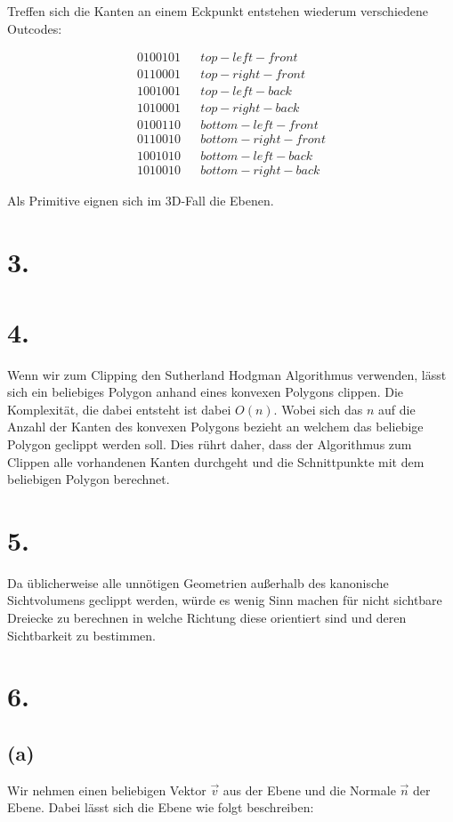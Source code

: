 \documentclass[12pt]{scrreprt}
\begin{document}
Treffen sich die Kanten an einem Eckpunkt entstehen wiederum verschiedene Outcodes:

\begin{align*}
	0100101& &top-left-front\\
	0110001& &top-right-front\\
	1001001& &top-left-back\\
	1010001& &top-right-back\\
	0100110& &bottom-left-front\\
	0110010& &bottom-right-front\\
	1001010& &bottom-left-back\\
	1010010& &bottom-right-back
\end{align*}

Als Primitive eignen sich im 3D-Fall die Ebenen.

\section*{3.}
\section*{4.}
Wenn wir zum Clipping den Sutherland Hodgman Algorithmus verwenden, lässt sich ein beliebiges Polygon anhand eines konvexen Polygons clippen. Die Komplexität, die dabei entsteht ist dabei $O(n)$. Wobei sich das $n$ auf die Anzahl der Kanten des konvexen Polygons bezieht an welchem das beliebige Polygon geclippt werden soll. Dies rührt daher, dass der Algorithmus zum Clippen alle vorhandenen Kanten durchgeht und die Schnittpunkte mit dem beliebigen Polygon berechnet.
\section*{5.}
Da üblicherweise alle unnötigen Geometrien außerhalb des kanonische Sichtvolumens geclippt werden, würde es wenig Sinn machen für nicht sichtbare Dreiecke zu berechnen in welche Richtung diese orientiert sind und deren Sichtbarkeit zu bestimmen.
\section*{6.}
\subsection*{(a)}
Wir nehmen einen beliebigen Vektor $\vec{v}$ aus der Ebene und die Normale $\vec{n}$ der Ebene. Dabei lässt sich die Ebene wie folgt beschreiben:
\end{document}
